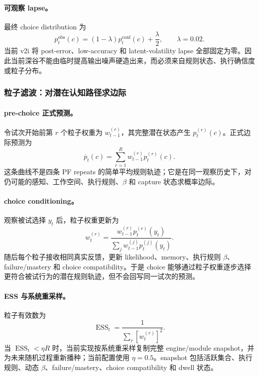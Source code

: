 \paragraph{可观察 lapse。}
最终 choice distribution 为
\begin{equation}
p_t^{\mathrm{obs}}(c)
=(1-\lambda)p_t^{\mathrm{conf}}(c)
+\frac{\lambda}{2},
\qquad \lambda=0.02.
\label{eq:model0811-output-lapse}
\end{equation}
当前 v2i 将 post-error、low-accuracy 和 latent-volatility lapse 全部固定为零。因此当前深谷不能由临时提高输出噪声硬造出来，而必须来自规则状态、执行确信度或粒子分布。


\subsubsection{粒子滤波：对潜在认知路径求边际}

\paragraph{pre-choice 正式预测。}
令试次开始前第 $r$ 个粒子权重为 $w^{(r)}_{t-1}$，其完整潜在状态产生
$p_t^{(r)}(c)$。正式边际预测为
\begin{equation}
\overline p_t(c)
=\sum_{r=1}^{R}w^{(r)}_{t-1}p_t^{(r)}(c).
\label{eq:model0811-pf-marginal}
\end{equation}
这条曲线不是四条 PF repeats 的简单平均规则轨迹；它是在同一观察历史下，对仍可能的感知、工作空间、执行规则、$\beta$ 和 capture 状态求概率边际。

\paragraph{choice conditioning。}
观察被试选择 $y_t$ 后，粒子权重更新为
\begin{equation}
w^{(r)}_t
=
\frac{w^{(r)}_{t-1}p_t^{(r)}(y_t)}
{\sum_jw^{(j)}_{t-1}p_t^{(j)}(y_t)}.
\label{eq:model0811-pf-weight}
\end{equation}
随后每个粒子接收相同真实反馈，更新 likelihood、memory、执行规则 $\beta$、failure/mastery 和 choice compatibility。于是 choice 能够通过粒子权重逐步选择更符合被试行为的潜在规则轨迹，但不会回写同一试次的预测。

\paragraph{ESS 与系统重采样。}
粒子有效数为
\begin{equation}
\operatorname{ESS}_t
=\frac{1}{\sum_r[w^{(r)}_t]^2}.
\label{eq:model0811-ess}
\end{equation}
当 $\operatorname{ESS}_t<\eta R$ 时，当前实现按系统重采样复制完整 engine/module snapshot，并为未来随机过程重新播种；当前配置使用 $\eta=0.5$。snapshot 包括活跃集合、执行规则、动态 $\beta$、failure/mastery、choice compatibility 和 dwell 状态。

